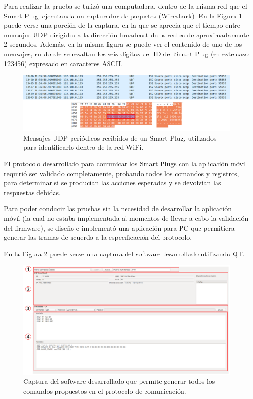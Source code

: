 Para realizar la prueba se tulizó una computadora, dentro de la misma red que el Smart Plug, ejecutando un capturador de paquetes (Wireshark). En la Figura \ref{fig:mensajes_udp} puede verse una porción de la captura, en la que se aprecia que el tiempo entre mensajes UDP dirigidos a la dirección broadcast de la red es de aproximadamente 2 segundos. Además, en la misma figura se puede ver el contenido de uno de los mensajes, en donde se resaltan los seis dígitos del ID del Smart Plug (en este caso 123456) expresado en caracteres ASCII.

\begin{figure}[h]
	\centering
	\includegraphics[width=12cm]{./Figures/4_1_2_mensajes_udp.png}
	\caption{Mensajes UDP periódicos recibidos de un Smart Plug, utilizados para identificarlo dentro de la red WiFi.}
	\label{fig:mensajes_udp}
\end{figure}


El protocolo desarrollado para comunicar los Smart Plugs con la aplicación móvil requirió ser validado completamente, probando todos los comandos y registros, para determinar si se producían las acciones esperadas y se devolvían las respuestas debidas.

Para poder conducir las pruebas sin la necesidad de desarrollar la aplicación móvil (la cual no estaba implementada al momentos de llevar a cabo la validación del firmware), se diseño e implementó una aplicación para PC que permitiera generar las tramas de acuerdo a la especificación del protocolo.

En la Figura \ref{fig:simulador_tcp} puede verse una captura del software desarrollado utilizando QT.

\begin{figure}[h]
	\centering
	\includegraphics[width=14cm]{./Figures/4_1_2_simulador_tcp.png}
	\caption{Captura del software desarrollado que permite generar todos los comandos propuestos en el protocolo de comunicación.}
	\label{fig:simulador_tcp}
\end{figure}

